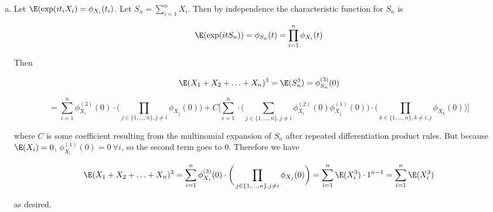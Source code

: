 \begin{enumerate}[(a)]

\item Let \(\E(\exp(it_iX_i) = \phi_{X_i}(t_i)\). Let \(S_n = \sum_{i=1}^n X_i\). Then by independence the characteristic function for \(S_n\) is

\[
\E(\exp(itS_n)) = \phi_{S_n}(t) = \prod_{i=1}^n \phi_{X_i}(t)
\]

Then 

\[
\E(X_1 + X_2 + \ldots + X_n)^3 = \E(S_n^3) = \phi_{S_n}^{(3)} (0)
\]

\[
= \sum_{i=1}^n \phi_{X_i}^{(3)}(0) \cdot \bigg( \prod_{j \in \{1, \ldots, n\}, j \neq i}\phi_{X_j}(0) \bigg) + C \bigg[ \sum_{i=1}^n \cdot \bigg( \sum_{j \in \{1, \ldots, n\}, j \neq i} \phi_{X_i}^{(2)} (0) \phi_{X_j}^{(1)}(0) \bigg)  \cdot \bigg( \prod_{k \in \{1, \ldots, n\}, k \neq i, j} \phi_{X_k}(0) \bigg) \bigg]
\]

where \(C\) is some coefficient resulting from the multinomial expansion of \(S_n\) after repeated differentiation product rules. But because \(\E(X_i) = 0\), \(\phi_{X_i}^{(1)} (0) = 0 \ \forall i\), so the second term goes to 0. Therefore we have

\[
\E(X_1 + X_2 + \ldots + X_n)^3  = \sum_{i=1}^n \phi_{X_i}^{(3)}(0) \cdot \bigg( \prod_{j \in \{1, \ldots, n\}, j \neq i}\phi_{X_j}(0) \bigg) = \sum_{i=1}^n \E(X_i^3) \cdot 1^{n-1} = \sum_{i=1}^n \E(X_i^3)
\]

as desired.

%
%
%
%
%
%
%





\end{enumerate}


